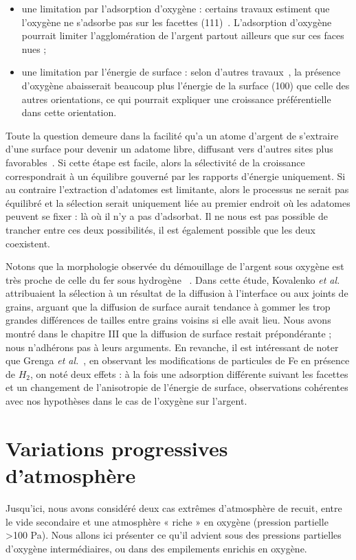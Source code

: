 {{\begin{itemize}
\item une limitation par l’adsorption d’oxygène : certains travaux estiment que l’oxygène ne s’adsorbe pas sur les facettes (111)~\cite{engelhardt1976adsorption}. L’adsorption d’oxygène pourrait limiter l’agglomération de l’argent partout ailleurs que sur ces faces \og nues \fg ;
\item une limitation par l’énergie de surface : selon d’autres travaux~\cite{molina2011size}, la présence d'oxygène abaisserait beaucoup plus l'énergie de la surface (100) que celle des autres orientations, ce qui pourrait expliquer une croissance préférentielle dans cette orientation.
\end{itemize}
Toute la question demeure dans la facilité qu’a un atome d’argent de s’extraire d’une surface pour devenir un adatome libre, diffusant vers d’autres sites plus favorables~\cite{combe00}. Si cette étape est facile, alors la sélectivité de la croissance correspondrait à un équilibre gouverné par les rapports d’énergie uniquement. Si au contraire l’extraction d’adatomes est limitante, alors le processus ne serait pas équilibré et la sélection serait uniquement liée au premier endroit où les adatomes peuvent se fixer : là où il n’y a pas d’adsorbat. Il ne nous est pas possible de trancher entre ces deux possibilités, il est également possible que les deux coexistent.\par
Notons que la morphologie observée du démouillage de l’argent sous oxygène est très proche de celle du fer sous hydrogène~\cite{kovalenko2013solid} . Dans cette étude, Kovalenko \textit{et al.} attribuaient la sélection à un résultat de la diffusion à l’interface ou aux joints de grains, arguant que la diffusion de surface aurait tendance à gommer les trop grandes différences de tailles entre grains voisins si elle avait lieu. Nous avons montré dans le chapitre III que la diffusion de surface restait prépondérante ; nous n’adhérons pas à leurs arguments. En revanche, il est intéressant de noter que Grenga \textit{et al.}~\cite{grenga1976surface}, en observant les modifications de particules de Fe en présence de $H_2$, on noté deux effets : à la fois une adsorption différente suivant les facettes et un changement de l’anisotropie de l’énergie de surface, observations cohérentes avec nos hypothèses dans le cas de l'oxygène sur l'argent.\par 

\section{Variations progressives d'atmosphère}
Jusqu’ici, nous avons considéré deux cas extrêmes d’atmosphère de recuit, entre le vide secondaire et une atmosphère « riche » en oxygène (pression partielle >100 Pa). Nous allons ici présenter ce qu’il advient sous des pressions partielles d’oxygène intermédiaires, ou dans des empilements enrichis en oxygène.\par 
}}
